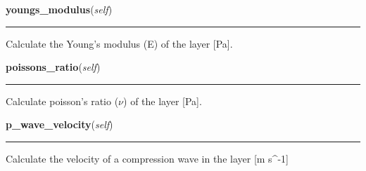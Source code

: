     \label{SatStress:SatStress:SatLayer:youngs_modulus}

    \vspace{0.5ex}

\hspace{.8\funcindent}\begin{boxedminipage}{\funcwidth}

    \raggedright \textbf{youngs\_modulus}(\textit{self})

    \vspace{-1.5ex}

    \rule{\textwidth}{0.5\fboxrule}
\setlength{\parskip}{2ex}
    Calculate the Young's modulus (E) of the layer [Pa].

\setlength{\parskip}{1ex}
    \end{boxedminipage}

    \label{SatStress:SatStress:SatLayer:poissons_ratio}

    \vspace{0.5ex}

\hspace{.8\funcindent}\begin{boxedminipage}{\funcwidth}

    \raggedright \textbf{poissons\_ratio}(\textit{self})

    \vspace{-1.5ex}

    \rule{\textwidth}{0.5\fboxrule}
\setlength{\parskip}{2ex}
    Calculate poisson's ratio (\(\nu\)) of the layer [Pa].

\setlength{\parskip}{1ex}
    \end{boxedminipage}

    \label{SatStress:SatStress:SatLayer:p_wave_velocity}

    \vspace{0.5ex}

\hspace{.8\funcindent}\begin{boxedminipage}{\funcwidth}

    \raggedright \textbf{p\_wave\_velocity}(\textit{self})

    \vspace{-1.5ex}

    \rule{\textwidth}{0.5\fboxrule}
\setlength{\parskip}{2ex}
    Calculate the velocity of a compression wave in the layer [m 
    s{\textasciicircum}-1]

\setlength{\parskip}{1ex}
    \end{boxedminipage}



